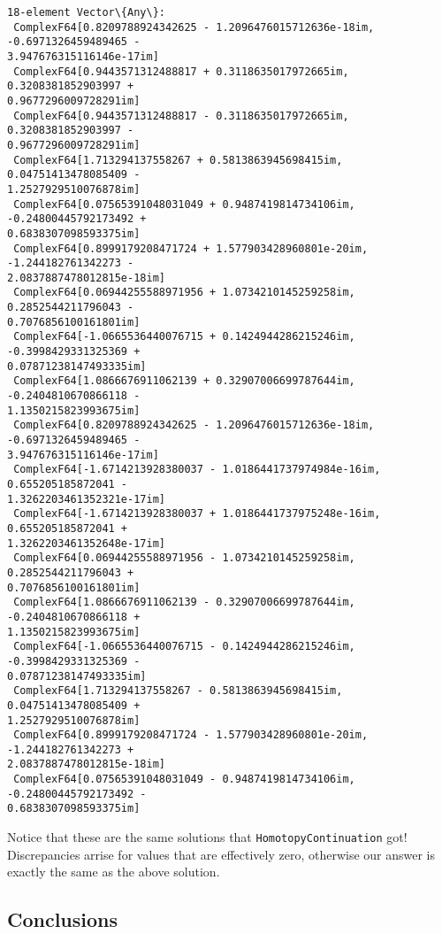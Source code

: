\documentclass[11pt]{article}
\makeatletter
\newcommand{\boxspacing}{\kern\kvtcb@left@rule\kern\kvtcb@boxsep}
\newcommand{\prompt}[4]{
        {\ttfamily\llap{{\color{#2}[#3]:\hspace{3pt}#4}}\vspace{-\baselineskip}}
    }
\makeatother
\begin{document}
            \begin{tcolorbox}[breakable, size=fbox, boxrule=.5pt, pad at break*=1mm, opacityfill=0]
\prompt{Out}{outcolor}{16}{\boxspacing}
\begin{Verbatim}[commandchars=\\\{\}]
18-element Vector\{Any\}:
 ComplexF64[0.8209788924342625 - 1.2096476015712636e-18im, -0.6971326459489465 -
3.947676315116146e-17im]
 ComplexF64[0.9443571312488817 + 0.3118635017972665im, 0.3208381852903997 +
0.9677296009728291im]
 ComplexF64[0.9443571312488817 - 0.3118635017972665im, 0.3208381852903997 -
0.9677296009728291im]
 ComplexF64[1.713294137558267 + 0.5813863945698415im, 0.04751413478085409 -
1.2527929510076878im]
 ComplexF64[0.07565391048031049 + 0.9487419814734106im, -0.24800445792173492 +
0.6838307098593375im]
 ComplexF64[0.8999179208471724 + 1.577903428960801e-20im, -1.244182761342273 -
2.0837887478012815e-18im]
 ComplexF64[0.06944255588971956 + 1.0734210145259258im, 0.2852544211796043 -
0.7076856100161801im]
 ComplexF64[-1.0665536440076715 + 0.1424944286215246im, -0.3998429331325369 +
0.07871238147493335im]
 ComplexF64[1.0866676911062139 + 0.32907006699787644im, -0.2404810670866118 -
1.1350215823993675im]
 ComplexF64[0.8209788924342625 - 1.2096476015712636e-18im, -0.6971326459489465 -
3.947676315116146e-17im]
 ComplexF64[-1.6714213928380037 - 1.0186441737974984e-16im, 0.655205185872041 -
1.3262203461352321e-17im]
 ComplexF64[-1.6714213928380037 + 1.0186441737975248e-16im, 0.655205185872041 +
1.3262203461352648e-17im]
 ComplexF64[0.06944255588971956 - 1.0734210145259258im, 0.2852544211796043 +
0.7076856100161801im]
 ComplexF64[1.0866676911062139 - 0.32907006699787644im, -0.2404810670866118 +
1.1350215823993675im]
 ComplexF64[-1.0665536440076715 - 0.1424944286215246im, -0.3998429331325369 -
0.07871238147493335im]
 ComplexF64[1.713294137558267 - 0.5813863945698415im, 0.04751413478085409 +
1.2527929510076878im]
 ComplexF64[0.8999179208471724 - 1.577903428960801e-20im, -1.244182761342273 +
2.0837887478012815e-18im]
 ComplexF64[0.07565391048031049 - 0.9487419814734106im, -0.24800445792173492 -
0.6838307098593375im]
\end{Verbatim}
\end{tcolorbox}
        
    Notice that these are the same solutions that
\texttt{HomotopyContinuation} got! Discrepancies arrise for values that
are effectively zero, otherwise our answer is exactly the same as the
above solution.

\hypertarget{conclusions}{%
\subsection{Conclusions}\label{conclusions}}
\end{document}
